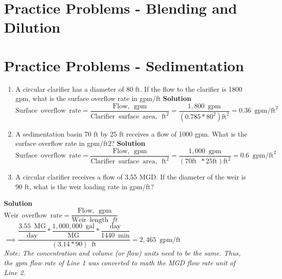 \section*{Practice Problems - Blending and Dilution}


\section*{Practice Problems - Sedimentation}

\begin{enumerate}

\item A circular clarifier has a diameter of 80 ft. If the flow to the clarifier is 1800 gpm, what is the surface overflow rate in gpm/ft
\vspace{0.2cm}
\textbf{Solution}\\

$\mathrm{Surface \enspace overflow \enspace rate}=\dfrac{\mathrm{Flow, \enspace gpm}}{\mathrm{Clarifier \enspace surface \enspace area, \enspace ft}^2}=\dfrac{1,800 \enspace \mathrm{gpm}}{(0.785*80^2 )\mathrm{ft}^2}=\boxed{0.36 \enspace \mathrm{gpm/ft}^2}$

\vspace{0.2cm}
\item A sedimentation basin 70 ft by 25 ft receives a flow of 1000 gpm. What is the surface overflow rate in gpm/ft$2$?
\vspace{0.2cm}
\textbf{Solution}\\
$\mathrm{Surface \enspace overflow \enspace rate}=\dfrac{\mathrm{Flow, \enspace gpm}}{\mathrm{Clarifier \enspace surface \enspace area, \enspace ft}^2}=\dfrac{1,000 \enspace \mathrm{gpm}}{(70 \mathrm{ft} \enspace * 25 \mathrm{ft})\mathrm{ft}^2}=\boxed{0.6 \enspace \mathrm{gpm/ft}^2}$

\vspace{0.2cm}

\item A circular clarifier receives a flow of 3.55 MGD. If the diameter of the weir is 90 ft, what is the weir loading rate in gpm/ft?
\end{enumerate}

\vspace{0.2cm}
\textbf{Solution}\\

$\mathrm{Weir \enspace overflow \enspace rate}=\dfrac{\mathrm{Flow, \enspace gpm}}{\mathrm{Weir} \enspace \mathrm{length} \enspace ft}$\\
\vspace{0.3cm}
$\implies \dfrac{ \dfrac{3.55 \enspace \mathrm{MG}}{\mathrm{day}}*\dfrac{1,000,000 \enspace \mathrm{gal}}{\mathrm{MG}}*\dfrac{\mathrm{day}}{1440 \enspace \mathrm{min}}}{ (3.14*90) \enspace \mathrm{ft}}=\boxed{2,465 \enspace  \mathrm{gpm/ft}}$\\
\vspace{0.3cm}
\textit{Note: The concentration and volume (or flow) units need to be the same.  Thus, the gpm flow rate of Line 1 was converted to math the MGD flow rate unit of Line 2.}



